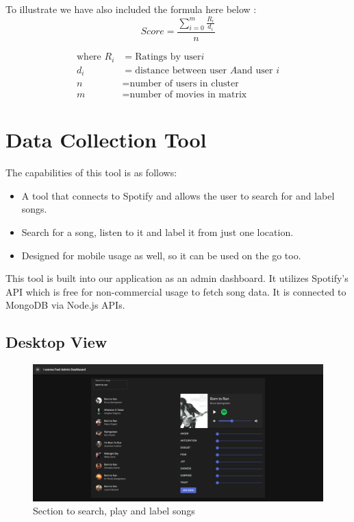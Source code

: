 To illustrate we have also included the formula here below :
$$ Score = \frac{\sum_{i=0}^{m}{\frac{R_{i}}{d_{i}}}}{n}      $$

\begin{align*}
\text{where } R_{i} &= \text{Ratings by user} i  \\
d_{i} &= \text{distance between user } A \text{and user }i\\
n &= \text{number of users in cluster} \\
m &= \text{number of movies in matrix}
\end{align*}

\section{Data Collection Tool}
The capabilities of this tool is as follows:
\begin{itemize}
	\item A tool that connects to Spotify and allows the user to search for and label songs.
	\item Search for a song, listen to it and label it from just one location.
	\item Designed for mobile usage as well, so it can be used on the go too.
\end{itemize}

This tool is built into our application as an admin dashboard. It utilizes Spotify’s API which is free for non-commercial usage to fetch song data. It is connected to MongoDB via Node.js APIs.
\subsection{Desktop View}
\begin{figure}[H]
\centering
\includegraphics[width=\textwidth]{imgs/data_collection_1.png}
\caption{Section to search, play and label songs}
\label{fig: data_collection_1}
\end{figure}

